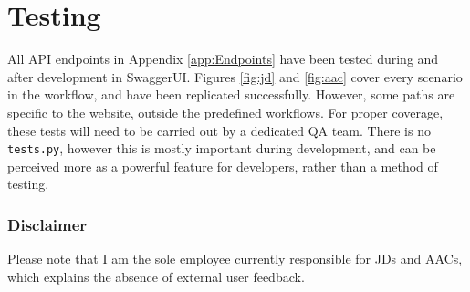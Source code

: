 \section{Testing}
All API endpoints in Appendix \ref{app:Endpoints} have been tested during and after development in SwaggerUI. Figures \ref{fig:jd} and \ref{fig:aac} cover every scenario in the workflow, and have been replicated successfully. However, some paths are specific to the website, outside the predefined workflows. For proper coverage, these tests will need to be carried out by a dedicated QA team. There is no \texttt{tests.py}, however this is mostly important during development, and can be perceived more as a powerful feature for developers, rather than a method of testing. 

\vfill
\subsubsection{Disclaimer}
\vspace{-5pt}
Please note that I am the sole employee currently responsible for JDs and AACs, which explains the absence of external user feedback.